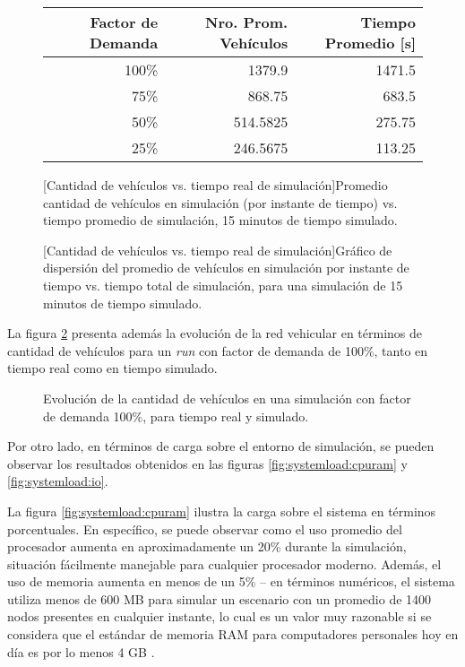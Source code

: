 \begin{figure}[htpb]
    \centering
    \begin{tabular}{@{}rrr@{}}
        \textbf{Factor de Demanda} & \textbf{Nro. Prom. Vehículos} & \textbf{Tiempo Promedio [s]} \\ \midrule
        100\%           & 1379.9          & 1471.5              \\ %
        75\%            & 868.75          & 683.5               \\ %
        50\%            & 514.5825        & 275.75              \\ %
        25\%            & 246.5675        & 113.25              \\ \bottomrule
    \end{tabular}
    [Cantidad de vehículos vs. tiempo real de simulación]{Promedio cantidad de vehículos en simulación (por instante de tiempo) vs. tiempo promedio de simulación, 15 minutos de tiempo simulado.}
    \label{table:vehiclesvstime}
    
    
    
    [Cantidad de vehículos vs. tiempo real de simulación]{Gráfico de dispersión del promedio de vehículos en simulación por instante de tiempo vs. tiempo total de simulación, para una simulación de 15 minutos de tiempo simulado.}
    \label{fig:vehiclesvstime}
\end{figure}

La figura \ref{fig:timevsvehicles_evolution} presenta además la evolución de la red vehicular en términos de cantidad de vehículos para un \emph{run} con factor de demanda de 100\%, tanto en tiempo real como en tiempo simulado. 

\begin{figure}[h]
    \centering
    
    \caption[Evolución temporal de la cantidad de vehículos en la simulación.]{Evolución de la cantidad de vehículos en una simulación con factor de demanda 100\%, para tiempo real y simulado.}
    \label{fig:timevsvehicles_evolution}
\end{figure}

Por otro lado, en términos de carga sobre el entorno de simulación, se pueden observar los resultados obtenidos en las figuras \ref{fig:systemload:cpuram} y \ref{fig:systemload:io}. 

La figura \ref{fig:systemload:cpuram} ilustra la carga sobre el sistema en términos porcentuales. En específico, se puede observar como el uso promedio del procesador aumenta en aproximadamente un 20\% durante la simulación, situación fácilmente manejable para cualquier procesador moderno. Además, el uso de memoria aumenta en menos de un 5\% -- en términos numéricos, el sistema utiliza menos de 600 MB para simular un escenario con un promedio de 1400 nodos presentes en cualquier instante, lo cual es un valor muy razonable si se considera que el estándar de memoria RAM para computadores personales hoy en día es por lo menos 4 GB \autocite{steamhwsurvey, unityhardwaresurvey}.

